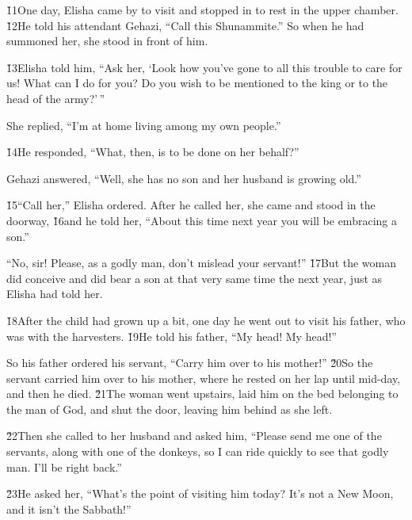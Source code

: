 \v{11}One day, Elisha came by to visit and stopped in to rest in the upper chamber. \v{12}He told his attendant Gehazi, ``Call this Shunammite.'' So when he had summoned her, she stood in front of him.

\v{13}Elisha told him, ``Ask her, `Look how you've gone to all this trouble to care for us! What can I do for you? Do you wish to be mentioned to the king or to the head of the army?'\,''

She replied, ``I'm at home living among my own people.''

\v{14}He responded, ``What, then, is to be done on her behalf?''

Gehazi answered, ``Well, she has no son and her husband is growing old.''

\v{15}``Call her,'' Elisha ordered. After he called her, she came and stood in the doorway, \v{16}and he told her, ``About this time next year you will be embracing a son.''

``No, sir! Please, as a godly man, don't mislead your servant!'' \v{17}But the woman did conceive and did bear a son at that very same time the next year, just as Elisha had told her.

\v{18}After the child had grown up a bit, one day he went out to visit his father, who was with the harvesters. \v{19}He told his father, ``My head! My head!''

So his father ordered his servant, ``Carry him over to his mother!'' \v{20}So the servant carried him over to his mother, where he rested on her lap until mid-day, and then he died. \v{21}The woman went upstairs, laid him on the bed belonging to the man of God, and shut the door, leaving him behind as she left.

\v{22}Then she called to her husband and asked him, ``Please send me one of the servants, along with one of the donkeys, so I can ride quickly to see that godly man. I'll be right back.''

\v{23}He asked her, ``What's the point of visiting him today? It's not a New Moon, and it isn't the Sabbath!''

